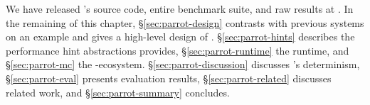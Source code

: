 We have released \parrot's source code, entire benchmark suite, and
raw results at \github. In the remaining of this chapter,
\S\ref{sec:parrot-design} contrasts \parrot with 
previous systems on an example and gives a high-level design of
\parrot. \S\ref{sec:parrot-hints} describes the performance hint abstractions
\parrot provides, \S\ref{sec:parrot-runtime} the \parrot runtime,
and \S\ref{sec:parrot-mc} the
\parrot-\dbug ecosystem. \S\ref{sec:parrot-discussion} discusses \parrot's
determinism, \S\ref{sec:parrot-eval}
presents evaluation results, \S\ref{sec:parrot-related}
discusses related work, and \S\ref{sec:parrot-summary} concludes.
